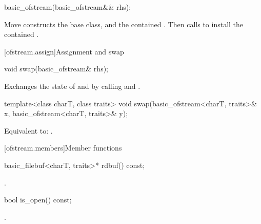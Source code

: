 %
\begin{itemdecl}
basic_ofstream(basic_ofstream&& rhs);
\end{itemdecl}

\begin{itemdescr}
\pnum
\effects
Move constructs the base class, and the contained .
Then calls 
to install the contained .
\end{itemdescr}

[ofstream.assign]{Assignment and swap}

%
\begin{itemdecl}
void swap(basic_ofstream& rhs);
\end{itemdecl}

\begin{itemdescr}
\pnum
\effects
Exchanges the state of 
and  by calling
 and
.
\end{itemdescr}

%
\begin{itemdecl}
template<class charT, class traits>
  void swap(basic_ofstream<charT, traits>& x,
            basic_ofstream<charT, traits>& y);
\end{itemdecl}

\begin{itemdescr}
\pnum
\effects
Equivalent to: .
\end{itemdescr}

[ofstream.members]{Member functions}

%
\begin{itemdecl}
basic_filebuf<charT, traits>* rdbuf() const;
\end{itemdecl}

\begin{itemdescr}
\pnum
\returns
{}.
\end{itemdescr}

%
\begin{itemdecl}
bool is_open() const;
\end{itemdecl}

\begin{itemdescr}
\pnum
\returns
{}.
\end{itemdescr}

